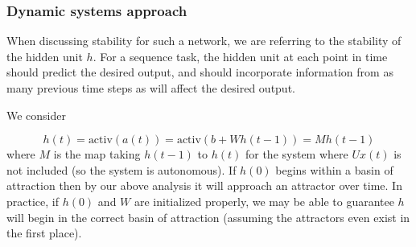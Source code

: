 \documentclass{beamer}
\begin{document}
\begin{frame}
  \frametitle{Dynamic systems approach}
  When discussing stability for such a network, we are referring to the stability of the hidden unit $h$. For a sequence task, the hidden unit at each point in time should predict the desired output, and should incorporate information from as many previous time steps as will affect the desired output.

    \vspace{0.5cm}

  We consider

\begin{equation*}
h(t) = \mbox{activ}(a(t)) = \mbox{activ}(b + W h(t-1)) = M h(t-1)
\end{equation*}
%
where $M$ is the map taking $h(t - 1)$ to $h(t)$ for the system where $Ux(t)$ is not included (so the system is autonomous). If $h(0)$ begins within a basin of attraction then by our above analysis it will approach an attractor over time. In practice, if $h(0)$ and $W$ are initialized properly, we may be able to guarantee $h$ will begin in the correct basin of attraction (assuming the attractors even exist in the first place).

\end{frame}
\end{document}
